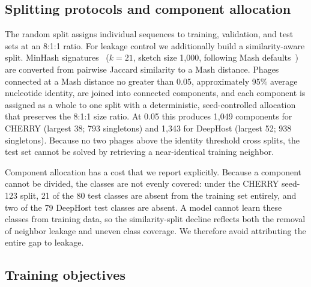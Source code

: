 \documentclass[utf8]{FrontiersinVancouver}
\begin{document}
\subsection{Splitting protocols and component allocation}

The random split assigns individual sequences to training, validation, and test sets at an 8:1:1 ratio. For leakage control we additionally build a similarity-aware split. MinHash signatures~\citep{broder1997resemblance} ($k=21$, sketch size 1,000, following Mash defaults~\citep{ondov2016mash}) are converted from pairwise Jaccard similarity to a Mash distance. Phages connected at a Mash distance no greater than 0.05, approximately 95\% average nucleotide identity, are joined into connected components, and each component is assigned as a whole to one split with a deterministic, seed-controlled allocation that preserves the 8:1:1 size ratio. At 0.05 this produces 1,049 components for CHERRY (largest 38; 793 singletons) and 1,343 for DeepHost (largest 52; 938 singletons). Because no two phages above the identity threshold cross splits, the test set cannot be solved by retrieving a near-identical training neighbor.

Component allocation has a cost that we report explicitly. Because a component cannot be divided, the classes are not evenly covered: under the CHERRY seed-123 split, 21 of the 80 test classes are absent from the training set entirely, and two of the 79 DeepHost test classes are absent. A model cannot learn these classes from training data, so the similarity-split decline reflects both the removal of neighbor leakage and uneven class coverage. We therefore avoid attributing the entire gap to leakage.

\subsection{Training objectives}
\end{document}
